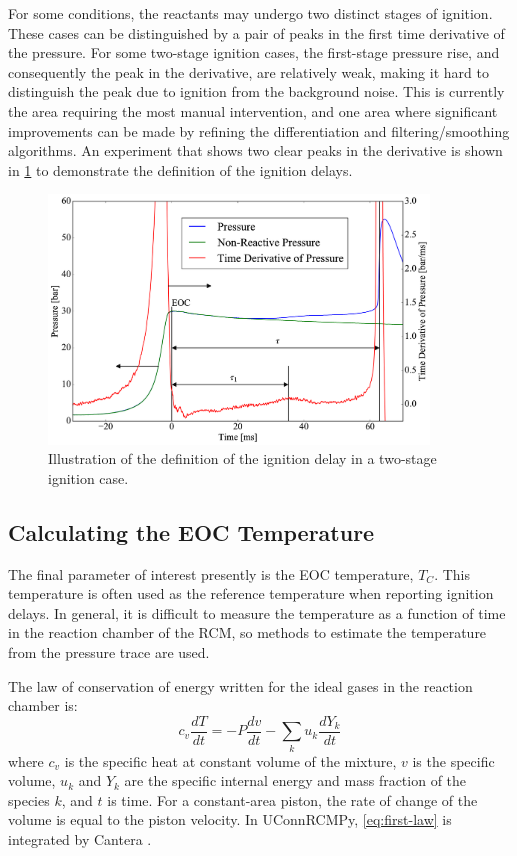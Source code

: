 \documentclass[12pt]{../ussci}
\begin{document}
For some conditions, the reactants may undergo two distinct stages of
ignition. These cases can be distinguished by a pair of peaks in the
first time derivative of the pressure. For some two-stage ignition
cases, the first-stage pressure rise, and consequently the peak in the
derivative, are relatively weak, making it hard to distinguish the peak
due to ignition from the background noise. This is currently the area
requiring the most manual intervention, and one area where significant
improvements can be made by refining the differentiation and
filtering/smoothing algorithms. An experiment that shows two clear peaks
in the derivative is shown in \cref{fig:ign-delay-def} to
demonstrate the definition of the ignition delays.

\begin{figure}[htbp]
\centering
\includegraphics[width=0.9\textwidth]{figures/ign-delay-def.png}
\caption{Illustration of the definition of the ignition delay in a
two-stage ignition case.}
\label{fig:ign-delay-def}
\end{figure}

\subsection{Calculating the EOC Temperature}\label{calculating-the-eoc-temperature}

The final parameter of interest presently is the EOC temperature,
\(T_C\). This temperature is often used as the reference temperature
when reporting ignition delays. In general, it is difficult to measure
the temperature as a function of time in the reaction chamber of the
RCM, so methods to estimate the temperature from the pressure trace are
used.

The law of conservation of energy written for the ideal gases in the
reaction chamber is:
%
\begin{equation} \label{eq:first-law}
    c_v \frac{dT}{dt} = -P \frac{dv}{dt} - \sum_k u_k \frac{d Y_k}{dt}
\end{equation}
%
where \(c_v\) is the specific heat at constant volume of the mixture,
\(v\) is the specific volume, \(u_k\) and \(Y_k\) are the specific
internal energy and mass fraction of the species \(k\), and \(t\) is
time. For a constant-area piston, the rate of change of the volume is
equal to the piston velocity. In UConnRCMPy, \cref{eq:first-law} is
integrated by Cantera \autocite{cantera}.
\end{document}
